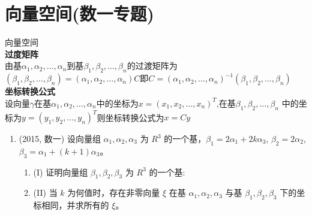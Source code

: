 \documentclass[12pt, a4paper, oneside, UTF8]{ctexbook}
\begin{document}
\section{向量空间(数一专题)}
\begin{remark}
    向量空间 \\
    \textbf{过度矩阵} \\
    由基$\alpha_1,\alpha_2,\ldots,\alpha_n$到基$\beta_1,\beta_2,\ldots,\beta_n$的过渡矩阵为$(\beta_1,\beta_2,\ldots,\beta_n)
    =(\alpha_1,\alpha_2,\ldots,\alpha_n)C$即$C=(\alpha_1,\alpha_2,\ldots,\alpha_n)^{-1}(\beta_1,\beta_2,\ldots,\beta_n)$ \\
    \textbf{坐标转换公式} \\
    设向量$\gamma$在基$\alpha_1,\alpha_2,\ldots,\alpha_n$中的坐标为$x=(x_1,x_2,\ldots,x_n)^{T}$,在基$\beta_1,\beta_2,\ldots,\beta_n$
    中的坐标为$y=(y_1,y_2,\ldots,y_n)^{T}$则坐标转换公式为$x=Cy$
\end{remark}
\begin{enumerate}
    \item (2015, 数一) 设向量组 $\alpha_1, \alpha_2, \alpha_3$ 为 $R^3$ 的一个基，$\beta_1 = 2\alpha_1 + 2k\alpha_3$, $\beta_2 = 2\alpha_2$,
    $\beta_3 = \alpha_1 + (k+1)\alpha_3$。
    \begin{enumerate}
        \item (I) 证明向量组 $\beta_1, \beta_2, \beta_3$ 为 $R^3$ 的一个基:
        \item (II) 当 $k$ 为何值时，存在非零向量 $\xi$ 在基 $\alpha_1, \alpha_2, \alpha_3$ 与基 $\beta_1, \beta_2, \beta_3$ 下的坐标相同，并求所有的 $\xi$。
    \end{enumerate}
    
    \begin{solution}
    \newpage
    \end{solution}
\end{enumerate}

\ifx\allfiles\undefined
\end{document}
